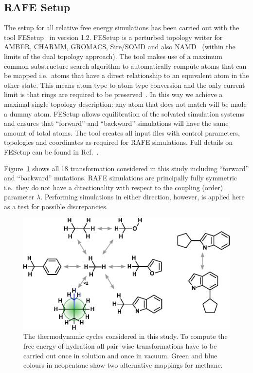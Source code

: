 \documentclass[journal=jctcce,manuscript=article]{achemso}
\begin{document}
\subsection{RAFE Setup}
\label{sec:rafe_setup}

The setup for all relative free energy simulations has been carried
out with the tool FESetup~\cite{loeffler_fesetup:_2015} in version
1.2.  FESetup is a perturbed topology writer for AMBER, CHARMM,
GROMACS, Sire/SOMD and also NAMD~\cite{JCC:JCC20289} (within the
limits of the dual topology approach).  The tool makes use of a
maximum common substructure search algorithm to automatically compute
atoms that can be mapped i.e.\ atoms that have a direct relationship
to an equivalent atom in the other state.  This means atom type to
atom type conversion and the only current limit is that rings are
required to be preserved~\cite{doi:10.1021/acs.jcim.5b00057}.  In this
way we achieve a maximal single topology description: any atom that
does not match will be made a dummy atom.  FESetup allows
equilibration of the solvated simulation systems and ensures that
``forward'' and ``backward'' simulations will have the same amount of
total atoms.  The tool creates all input files with control
parameters, topologies and coordinates as required for RAFE
simulations.  Full details on FESetup can be found in
Ref.~.

Figure~\ref{fig:cycles} shows all 18 transformation considered in this
study including ``forward'' and ``backward'' mutations.  RAFE
simulations are principally fully symmetric i.e.\ they do not have a
directionality with respect to the coupling (order) parameter
$\lambda$.  Performing simulations in either direction, however, is
applied here as a test for possible discrepancies.

\begin{figure}[ht]
\includegraphics[scale=1.0]{figures/cycles.pdf}
\caption{The thermodynamic cycles considered in this study.  To
  compute the free energy of hydration all pair--wise transformations
  have to be carried out once in solution and once in vacuum.  Green
  and blue colours in neopentane show two alternative mappings for
  methane.}
\label{fig:cycles}
\end{figure}
\end{document}
